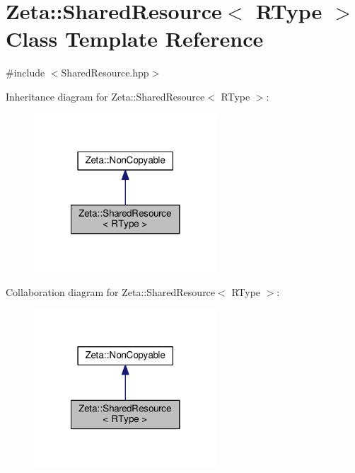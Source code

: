 \hypertarget{classZeta_1_1SharedResource}{\section{Zeta\+:\+:Shared\+Resource$<$ R\+Type $>$ Class Template Reference}
\label{classZeta_1_1SharedResource}
}


{\ttfamily \#include $<$Shared\+Resource.\+hpp$>$}



Inheritance diagram for Zeta\+:\+:Shared\+Resource$<$ R\+Type $>$\+:\nopagebreak
\begin{figure}[H]
\begin{center}
\leavevmode
\includegraphics[width=194pt]{classZeta_1_1SharedResource__inherit__graph}
\end{center}
\end{figure}


Collaboration diagram for Zeta\+:\+:Shared\+Resource$<$ R\+Type $>$\+:\nopagebreak
\begin{figure}[H]
\begin{center}
\leavevmode
\includegraphics[width=194pt]{classZeta_1_1SharedResource__coll__graph}
\end{center}
\end{figure}
